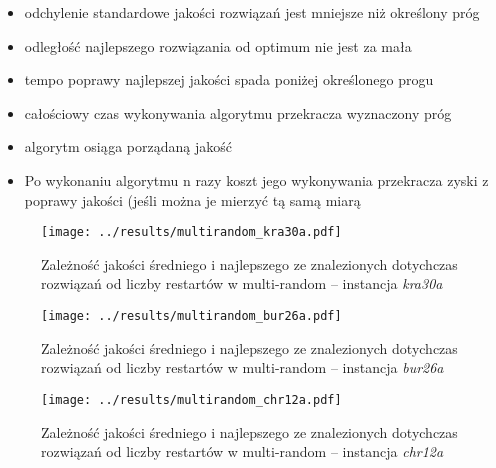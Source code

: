 \documentclass{article}
\begin{document}
			\begin{itemize}
				\item{odchylenie standardowe jakości rozwiązań jest mniejsze niż określony próg}
				\item{odległość najlepszego rozwiązania od optimum nie jest za mała}
				\item{tempo poprawy najlepszej jakości spada poniżej określonego progu}
				\item{całościowy czas wykonywania algorytmu przekracza wyznaczony próg}
				\item{algorytm osiąga porządaną jakość}
				\item{Po wykonaniu algorytmu n razy koszt jego wykonywania przekracza zyski z poprawy jakości (jeśli można je mierzyć tą samą miarą}
			\end{itemize}
			\begin{figure}[h]
				\texttt{[image: ../results/multirandom\_kra30a.pdf]}
				\caption{Zależność jakości średniego i najlepszego ze znalezionych dotychczas rozwiązań od liczby restartów w multi-random -- instancja \emph{kra30a}\label{fig:mr.kra30a}}		
			\end{figure}
			\begin{figure}[h]
				\texttt{[image: ../results/multirandom\_bur26a.pdf]}
				\caption{Zależność jakości średniego i najlepszego ze znalezionych dotychczas rozwiązań od liczby restartów w multi-random -- instancja \emph{bur26a}\label{fig:mr.bur26a}}		
			\end{figure}
			\begin{figure}[h]
				\texttt{[image: ../results/multirandom\_chr12a.pdf]}
				\caption{Zależność jakości średniego i najlepszego ze znalezionych dotychczas rozwiązań od liczby restartów w multi-random -- instancja \emph{chr12a}\label{fig:mr.chr12a}}		
			\end{figure}
\end{document}
